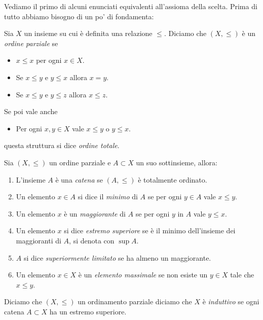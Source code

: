 \documentclass[11pt]{scrartcl}
\begin{document}
  Vediamo il primo di alcuni enunciati equivalenti all'assioma della scelta. Prima di tutto abbiamo bisogno di un po' di fondamenta:
  \begin{definition}
  	Sia $X$ un insieme su cui è definita una relazione $\le$. Diciamo che $(X,\le)$ è un \textit{ordine parziale} se
  	\begin{itemize}
  		\item[i)] $x\le x$ per ogni $x\in X$.
  		\item[ii)] Se $x\le y$ e $y\le x$ allora $x=y$.
  		\item[iii)] Se $x\le y$ e $y\le z$ allora $x\le z$.
  	\end{itemize}
  	Se poi vale anche 
  	\begin{itemize}
  		\item[iv)] Per ogni $x,y\in X$ vale $x\le y$ o $y\le x$. 
  	\end{itemize}
  	questa struttura si dice \textit{ordine totale}.
  \end{definition}
  \begin{definition}
  	Sia $(X,\le)$ un ordine parziale e $A\subset X$ un suo sottinsieme, allora:
  	\begin{enumerate}
  		\item L'insieme $A$ è una \textit{catena} se $(A,\le)$ è totalmente ordinato.
  		\item Un elemento $x\in A$ si dice il \textit{minimo} di $A$ se per ogni $y\in A$ vale $x\le y$.
  		\item Un elemento $x$ è un \textit{maggiorante} di $A$ se per ogni $y$ in $A$ vale $y\le x$.
  		\item Un elemento $x$ si dice \textit{estremo superiore} se è il minimo dell'insieme dei maggioranti di $A$, si denota con $\sup A$.
  		\item $A$ si dice \textit{superiormente limitato} se ha almeno un maggiorante.
  		\item Un elemento $x\in X$ è un \textit{elemento massimale} se non esiste un $y\in X$ tale che $x\le y$.
  	\end{enumerate}
  \end{definition}
  \begin{definition}
  	Diciamo che $(X,\le )$ un ordinamento parziale diciamo che $X$ è \textit{induttivo} se ogni catena $A\subset X$ ha un estremo superiore.
  \end{definition}
  
\end{document}
